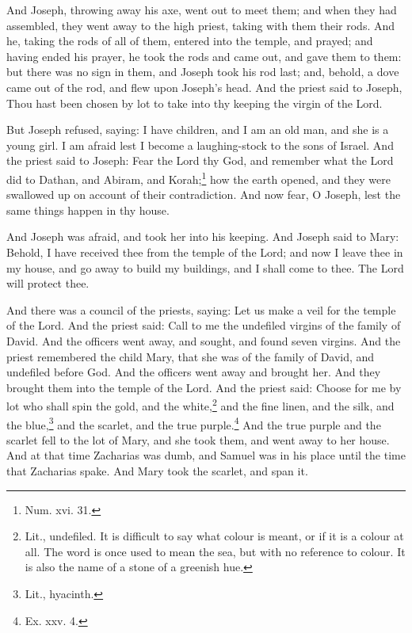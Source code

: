 \pend\pstart
{}

\pend\setcounter{pstartR}{1}\pstart
And Joseph, throwing away his axe, went out to meet them; and when they had assembled, they went away to the high priest, taking with them their rods. And he, taking the rods of all of them, entered into the temple, and prayed; and having ended his prayer, he took the rods and came out, and gave them to them: but there was no sign in them, and Joseph took his rod last; and, behold, a dove came out of the rod, and flew upon Joseph's head. And the priest said to Joseph, Thou hast been chosen by lot to take into thy keeping the virgin of the Lord.

\pend\pstart
But Joseph refused, saying: I have children, and I am an old man, and she is a young girl. I am afraid lest I become a laughing-stock to the sons of Israel. And the priest said to Joseph: Fear the Lord thy God, and remember what the Lord did to Dathan, and Abiram, and Korah;\footnote{Num. xvi. 31.} how the earth opened, and they were swallowed up on account of their contradiction. And now fear, O Joseph, lest the same things happen in thy house.

\pend\pstart
And Joseph was afraid, and took her into his keeping. And Joseph said to Mary: Behold, I have received thee from the temple of the Lord; and now I leave thee in my house, and go away to build my buildings, and I shall come to thee. The Lord will protect thee.

\pend\pstart
{}

\pend\setcounter{pstartR}{1}\pstart
And there was a council of the priests, saying: Let us make a veil for the temple of the Lord. And the priest said: Call to me the undefiled virgins of the family of David. And the officers went away, and sought, and found seven virgins. And the priest remembered the child Mary, that she was of the family of David, and undefiled before God. And the officers went away and brought her. And they brought them into the temple of the Lord. And the priest said: Choose for me by lot who shall spin the gold, and the white,\footnote{Lit., undefiled. It is difficult to say what colour is meant, or if it is a colour at all. The word is once used to mean the sea, but with no reference to colour. It is also the name of a stone of a greenish hue.} and the fine linen, and the silk, and the blue,\footnote{Lit., hyacinth.} and the scarlet, and the true purple.\footnote{Ex. xxv. 4.} And the true purple and the scarlet fell to the lot of Mary, and she took them, and went away to her house. And at that time Zacharias was dumb, and Samuel was in his place until the time that Zacharias spake. And Mary took the scarlet, and span it.

